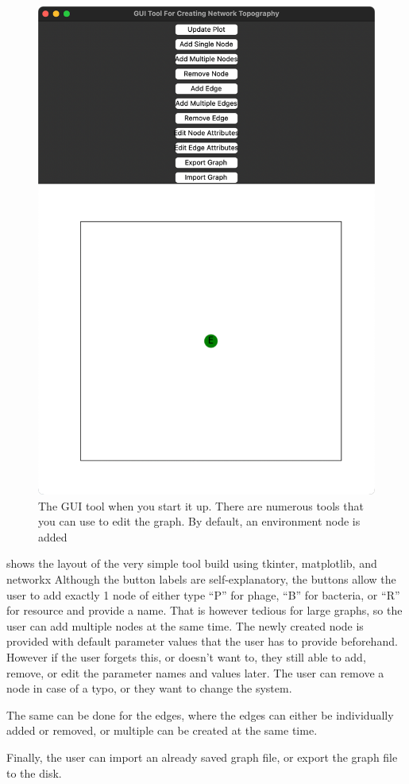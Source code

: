 \begin{figure}
    \centering
    \includegraphics[width=0.5\linewidth]{Chapters/Screenshots/initial_startup_GUI_tool.png}
    \caption{The GUI tool when you start it up. There are numerous tools that you can use to edit the graph. By default, an environment node is added}
    \label{fig:ss:initial_startup_GUI_tool}
\end{figure}
 shows the layout of the very simple tool build using tkinter, matplotlib, and networkx %
Although the button labels are self-explanatory, the buttons allow the user to add exactly 1 node of either type “P” for phage, “B” for bacteria, or “R” for resource and provide a name. 
That is however tedious for large graphs, so the user can add multiple nodes at the same time. 
The newly created node is provided with default parameter values that the user has to provide beforehand. 
However if the user forgets this, or doesn't want to, they still able to add, remove, or edit the parameter names and values later. 
The user can remove a node in case of a typo, or they want to change the system. 

The same can be done for the edges, where the edges can either be individually added or removed, or multiple can be created at the same time. 

Finally, the user can import an already saved graph file, or export the graph file to the disk. 





